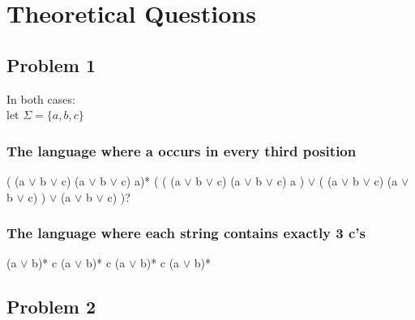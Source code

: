 
\usepackage{algorithm}
\usepackage{listings}
\usepackage{graphicx,amssymb,amsmath}
\usepackage{epstopdf}
\sloppy

\oddsidemargin -0.5in
\evensidemargin -0.5in
\textwidth 7.5in
\topmargin -0.5in
\textheight 9.0in




\pagestyle{myheadings}  %
	 	
\section{Theoretical Questions}

\subsection{Problem 1}

In both cases: \\
let \( \Sigma = \{ a, b, c \} \)

\subsubsection{The language where a occurs in every third position}

\def \booleanOr { \( \vee \) }
\def \abcDisjunction { (a \( \vee \) b \( \vee \) c) }
( \abcDisjunction \abcDisjunction a)* ( ( \abcDisjunction \abcDisjunction a ) \booleanOr ( \abcDisjunction \abcDisjunction ) \booleanOr \abcDisjunction )? 

\subsubsection{The language where each string contains exactly 3 c's}
(a \(\vee\) b)* c (a \(\vee\) b)* c (a \(\vee\) b)* c (a \(\vee\) b)*

\subsection{Problem 2}

